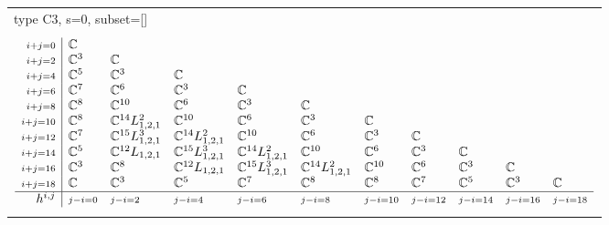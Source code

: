 \documentclass[crop,border=2mm]{standalone}
\begin{document}
\begin{tabular}{l}
{\huge type C3, s=0, subset=[]}\\ \\


$\displaystyle
\begin{array}{r|l l l l l l l l l l}
	{\scriptstyle i+j=0}&\mathbb{C}&&&&&&&&&\\
	{\scriptstyle i+j=2}&\mathbb{C}^{3}&\mathbb{C}&&&&&&&&\\
	{\scriptstyle i+j=4}&\mathbb{C}^{5}&\mathbb{C}^{3}&\mathbb{C}&&&&&&&\\
	{\scriptstyle i+j=6}&\mathbb{C}^{7}&\mathbb{C}^{6}&\mathbb{C}^{3}&\mathbb{C}&&&&&&\\
	{\scriptstyle i+j=8}&\mathbb{C}^{8}&\mathbb{C}^{10}&\mathbb{C}^{6}&\mathbb{C}^{3}&\mathbb{C}&&&&&\\
	{\scriptstyle i+j=10}&\mathbb{C}^{8}&\mathbb{C}^{14}L_{1,2,1}^{2}&\mathbb{C}^{10}&\mathbb{C}^{6}&\mathbb{C}^{3}&\mathbb{C}&&&&\\
	{\scriptstyle i+j=12}&\mathbb{C}^{7}&\mathbb{C}^{15}L_{1,2,1}^{3}&\mathbb{C}^{14}L_{1,2,1}^{2}&\mathbb{C}^{10}&\mathbb{C}^{6}&\mathbb{C}^{3}&\mathbb{C}&&&\\
	{\scriptstyle i+j=14}&\mathbb{C}^{5}&\mathbb{C}^{12}L_{1,2,1}&\mathbb{C}^{15}L_{1,2,1}^{3}&\mathbb{C}^{14}L_{1,2,1}^{2}&\mathbb{C}^{10}&\mathbb{C}^{6}&\mathbb{C}^{3}&\mathbb{C}&&\\
	{\scriptstyle i+j=16}&\mathbb{C}^{3}&\mathbb{C}^{8}&\mathbb{C}^{12}L_{1,2,1}&\mathbb{C}^{15}L_{1,2,1}^{3}&\mathbb{C}^{14}L_{1,2,1}^{2}&\mathbb{C}^{10}&\mathbb{C}^{6}&\mathbb{C}^{3}&\mathbb{C}&\\
	{\scriptstyle i+j=18}&\mathbb{C}&\mathbb{C}^{3}&\mathbb{C}^{5}&\mathbb{C}^{7}&\mathbb{C}^{8}&\mathbb{C}^{8}&\mathbb{C}^{7}&\mathbb{C}^{5}&\mathbb{C}^{3}&\mathbb{C}\\
	\hline h^{i,j}&{\scriptstyle j-i=0}&{\scriptstyle j-i=2}&{\scriptstyle j-i=4}&{\scriptstyle j-i=6}&{\scriptstyle j-i=8}&{\scriptstyle j-i=10}&{\scriptstyle j-i=12}&{\scriptstyle j-i=14}&{\scriptstyle j-i=16}&{\scriptstyle j-i=18}
\end{array}
$ \\ \\



\end{tabular}
\end{document}
